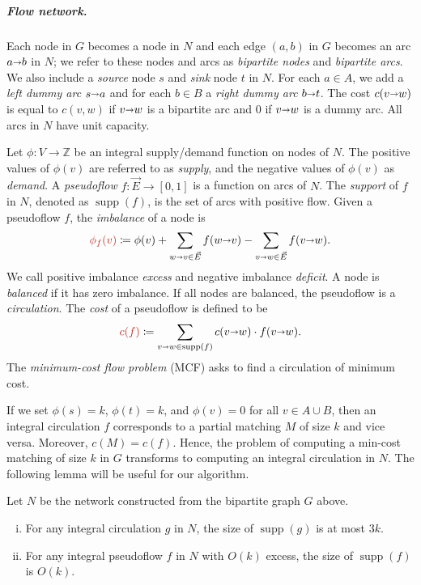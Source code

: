 \documentclass[a4paper,UKenglish]{socg-lipics-v2019}
\def\ints{\mathbb{Z}}
\def\Set#1{\left\{ #1 \right\}}
\def\fsupply{\phi}
\def\arcto{\mathord\shortrightarrow}
\def\arc#1#2{#1\arcto#2}
\def\cost{c}
\def\supp{\operatorname{supp}}
\theoremstyle{plain}
\numberwithin{figure}{section}
\renewcommand{\paragraph}{\subparagraph}
\def\EMPH#1{\textcolor{BrickRed}{{\emph{#1}}}}
\begin{document}
\paragraph{Flow network.}
Each node in $G$ becomes a node in $N$ and each edge
$(a, b)$ in $G$ becomes an arc $\arc{a}{b}$ in $N$;
we refer to these nodes and arcs as \EMPH{bipartite nodes} and \EMPH{bipartite arcs}.
We also include a \EMPH{source} node $s$ and \EMPH{sink} node $t$ in $N$.
For each $a \in A$, we add a \EMPH{left dummy arc} $\arc{s}{a}$ and for each
$b \in B$ a \EMPH{right dummy arc} $\arc{b}{t}$.
The cost \EMPH{$c(\arc{v}{w})$}
is equal to $c(v, w)$ if
$\arc{v}{w}$ is a bipartite arc and $0$ if $\arc{v}{w}$ is a dummy arc.
All arcs in $N$ have unit capacity.

Let $\fsupply: V \to \ints$ be an integral supply/demand function on nodes of $N$.
The positive values of $\fsupply(v)$ are referred to as \EMPH{supply}, and the
negative values of $\fsupply(v)$ as \EMPH{demand}.
A \EMPH{pseudoflow} $f: \vec{E} \to [0, 1]$ is a function on arcs of $N$.
The \EMPH{support} of $f$ in $N$, denoted as \EMPH{$\supp(f)$}, is the set of arcs with positive flow.
Given a pseudoflow $f$, the \EMPH{imbalance} of a node is
\[
\EMPH{$\fsupply_f (v)$} \coloneqq \fsupply(v) + \sum_{\arc wv \in \vec{E}}{f(\arc wv)} - \sum_{\arc vw \in \vec{E}}{f(\arc vw)}.
\]
We call positive imbalance \EMPH{excess} and negative imbalance \EMPH{deficit}.
A node is \EMPH{balanced} if it has zero imbalance.
If all nodes are balanced, the pseudoflow is a \EMPH{circulation}.
The \EMPH{cost} of a pseudoflow is defined to be
\[
 \EMPH{$\cost(f)$} \coloneqq \sum_{\arc vw \in \supp(f)} c(\arc vw) \cdot f(\arc vw).
\]
The \EMPH{minimum-cost flow problem} (MCF) asks to find a circulation of minimum cost.

If we set $\fsupply(s) = k$, $\fsupply(t) = k$, and $\fsupply(v) = 0$ for all
$v \in A \cup B$, then an integral circulation $f$ corresponds to a partial
matching $M$ of size $k$ and vice versa.
Moreover, $\cost(M) = \cost(f)$.
%
Hence, the problem of computing a min-cost matching of size $k$ in $G$
transforms to computing an integral circulation in $N$.
The following lemma will be useful for our algorithm.

\begin{lemma}
\label{lemma:supp_size}
Let $N$ be the network constructed from the bipartite graph $G$ above.
\begin{enumerate}[(i)]
\item For any integral circulation $g$ in $N$, the size of $\supp(g)$ is at most $3k$.
\item For any integral pseudoflow $f$ in $N$ with $O(k)$ excess, the size of $\supp(f)$ is $O(k)$.
\end{enumerate}
\end{lemma}
\end{document}
